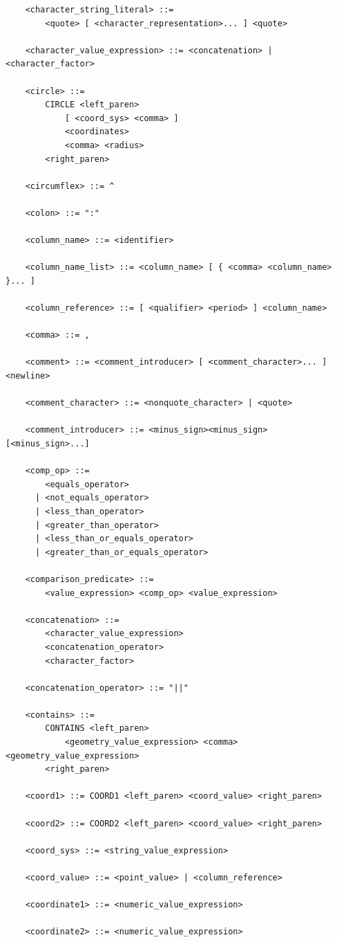 \documentclass[11pt,a4paper]{ivoa}
\begin{document}
\begin{verbatim}
    <character_string_literal> ::=
        <quote> [ <character_representation>... ] <quote>

    <character_value_expression> ::= <concatenation> | <character_factor>

    <circle> ::=
        CIRCLE <left_paren>
            [ <coord_sys> <comma> ]
            <coordinates>
            <comma> <radius>
        <right_paren>

    <circumflex> ::= ^

    <colon> ::= ":"

    <column_name> ::= <identifier>

    <column_name_list> ::= <column_name> [ { <comma> <column_name> }... ]

    <column_reference> ::= [ <qualifier> <period> ] <column_name>

    <comma> ::= ,

    <comment> ::= <comment_introducer> [ <comment_character>... ] <newline>

    <comment_character> ::= <nonquote_character> | <quote>

    <comment_introducer> ::= <minus_sign><minus_sign> [<minus_sign>...]

    <comp_op> ::=
        <equals_operator>
      | <not_equals_operator>
      | <less_than_operator>
      | <greater_than_operator>
      | <less_than_or_equals_operator>
      | <greater_than_or_equals_operator>

    <comparison_predicate> ::=
        <value_expression> <comp_op> <value_expression>

    <concatenation> ::=
        <character_value_expression>
        <concatenation_operator>
        <character_factor>

    <concatenation_operator> ::= "||"

    <contains> ::=
        CONTAINS <left_paren>
            <geometry_value_expression> <comma> <geometry_value_expression>
        <right_paren>

    <coord1> ::= COORD1 <left_paren> <coord_value> <right_paren>

    <coord2> ::= COORD2 <left_paren> <coord_value> <right_paren>

    <coord_sys> ::= <string_value_expression>

    <coord_value> ::= <point_value> | <column_reference>

    <coordinate1> ::= <numeric_value_expression>

    <coordinate2> ::= <numeric_value_expression>


\end{verbatim}
\end{document}
